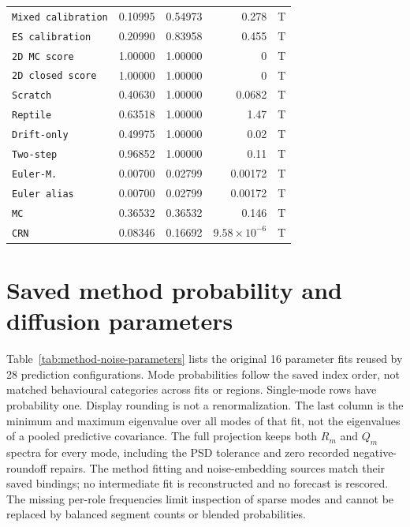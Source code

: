 \begin{longtable}{lrrrl}
\texttt{Mixed calibration} & 0.10995 & 0.54973 & 0.278 & T\\
\texttt{ES calibration} & 0.20990 & 0.83958 & 0.455 & T\\
\texttt{2D MC score} & 1.00000 & 1.00000 & 0 & T\\
\texttt{2D closed score} & 1.00000 & 1.00000 & 0 & T\\
\texttt{Scratch} & 0.40630 & 1.00000 & 0.0682 & T\\
\texttt{Reptile} & 0.63518 & 1.00000 & 1.47 & T\\
\texttt{Drift-only} & 0.49975 & 1.00000 & 0.02 & T\\
\texttt{Two-step} & 0.96852 & 1.00000 & 0.11 & T\\
\texttt{Euler-M.} & 0.00700 & 0.02799 & 0.00172 & T\\
\texttt{Euler alias} & 0.00700 & 0.02799 & 0.00172 & T\\
\texttt{MC} & 0.36532 & 0.36532 & 0.146 & T\\
\texttt{CRN} & 0.08346 & 0.16692 & \(9.58\times10^{-6}\) & T\\
\end{longtable}


\section{Saved method probability and diffusion parameters}
\label{sec:method-noise-parameters}\hypertarget{sec:method-noise-parameters}{}
Table~\ref{tab:method-noise-parameters} lists the original 16 parameter fits
reused by 28 prediction configurations. Mode probabilities follow the saved
index order, not matched behavioural categories across fits or regions.
Single-mode rows have probability one. Display rounding is not a
renormalization. The last column is the minimum and maximum eigenvalue over
all modes of that fit, not the eigenvalues of a pooled predictive covariance.
The full projection keeps both $R_m$ and $Q_m$ spectra for every mode,
including the PSD tolerance and zero recorded negative-roundoff repairs.
The method fitting and noise-embedding sources match their saved bindings;
no intermediate fit is reconstructed and no forecast is rescored.
The missing per-role frequencies limit inspection of sparse modes and
cannot be replaced by balanced segment counts or blended probabilities.

